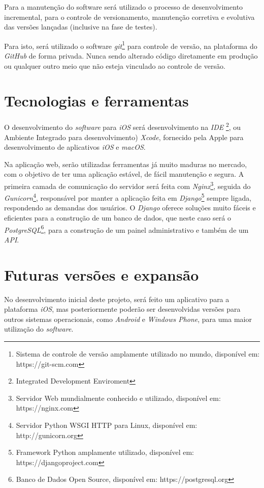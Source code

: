 \documentclass[
	12pt,
	oneside,
	a4paper,
	english,
	brazil,
]{abntex2}
\begin{document}
Para a manutenção do software será utilizado o processo de desenvolvimento incremental, para o controle de versionamento, manutenção corretiva e evolutiva das versões lançadas (inclusive na fase de testes).

Para isto, será utilizado o software \emph{git}\footnote{Sistema de controle de versão amplamente utilizado no mundo, disponível em: https://git-scm.com} para controle de versão, na plataforma do \emph{GitHub} de forma privada. Nunca sendo alterado código diretamente em produção ou qualquer outro meio que não esteja vinculado ao controle de versão.

\section{Tecnologias e ferramentas}

O desenvolvimento do \emph{software} para \emph{iOS} será desenvolvimento na \emph{IDE} \footnote{Integrated Development Enviroment}, ou Ambiente Integrado para desenvolvimento) \emph{Xcode}, fornecido pela Apple para desenvolvimento de aplicativos \emph{iOS} e \emph{macOS}.

Na aplicação web, serão utilizadas ferramentas já muito maduras no mercado, com o objetivo de ter uma aplicação estável, de fácil manutenção e segura. A primeira camada de comunicação do servidor será feita com \emph{Nginx}\footnote{Servidor Web mundialmente conhecido e utilizado, disponível em: https://nginx.com}, seguida do \emph{Gunicorn}\footnote{Servidor Python WSGI HTTP para Linux, disponível em: http://gunicorn.org}, responsável por manter a aplicação feita em \emph{Django}\footnote{Framework Python amplamente utilizado, disponível em: https://djangoproject.com} sempre ligada, respondendo as demandas dos usuários. O \emph{Django} oferece soluções muito fáceis e eficientes para a construção de um banco de dados, que neste caso será o \emph{PostgreSQL}\footnote{Banco de Dados Open Source, disponível em: https://postgresql.org}, para a construção de um painel administrativo e também de um \emph{API}.

\section{Futuras versões e expansão}

No desenvolvimento inicial deste projeto, será feito um aplicativo para a plataforma \emph{iOS}, mas posteriormente poderão ser desenvolvidas versões para outros sistemas operacionais, como \emph{Android} e \emph{Windows Phone}, para uma maior utilização do \emph{software}.
\end{document}
